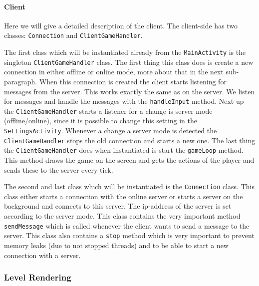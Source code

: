 \documentclass[../main.tex]{subfiles}
\begin{document}
        \paragraph{Client}
        Here we will give a detailed description of the client. The client-side has two classes: \texttt{Connection} and \texttt{ClientGameHandler}.

        The first class which will be instantiated already from the \texttt{MainActivity} is the singleton \texttt{ClientGameHandler} class. The first thing this class does is create a new connection in either offline or online mode, more about that in the next sub-paragraph. When this connection is created the client starts listening for messages from the server. This works exactly the same as on the server. We listen for messages and handle the messages with the \texttt{handleInput} method. Next up the \texttt{ClientGameHandler} starts a listener for a change is server mode (offline/online), since it is possible to change this setting in the \texttt{SettingsActivity}. Whenever a change a server mode is detected the \texttt{ClientGameHandler} stops the old connection and starts a new one. The last thing the \texttt{ClientGameHandler} does when instantiated is start the \texttt{gameLoop} method. This method draws the game on the screen and gets the actions of the player and sends these to the server every tick.

        The second and last class which will be instantiated is the \texttt{Connection} class. This class either starts a connection with the online server or starts a server on the background and connects to this server. The ip-address of the server is set according to the server mode. This class contains the very important method \texttt{sendMessage} which is called whenever the client wants to send a message to the server. This class also contains a \texttt{stop} method which is very important to prevent memory leaks (due to not stopped threads) and to be able to start a new connection with a server. 

		\subsubsection{Level Rendering}
\end{document}
